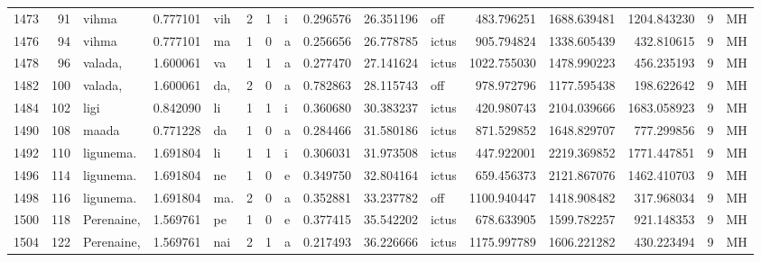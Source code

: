 \begin{tabular}{lrlrllllrrlrrrll}
1473 &          91 &            vihma &  0.777101 &     vih &        2 &      1 &       i &      0.296576 &     26.351196 &    off &   483.796251 &  1688.639481 &  1204.843230 &      9 &        MH \\
1476 &          94 &            vihma &  0.777101 &      ma &        1 &      0 &       a &      0.256656 &     26.778785 &  ictus &   905.794824 &  1338.605439 &   432.810615 &      9 &        MH \\
1478 &          96 &          valada, &  1.600061 &      va &        1 &      1 &       a &      0.277470 &     27.141624 &  ictus &  1022.755030 &  1478.990223 &   456.235193 &      9 &        MH \\
1482 &         100 &          valada, &  1.600061 &     da, &        2 &      0 &       a &      0.782863 &     28.115743 &    off &   978.972796 &  1177.595438 &   198.622642 &      9 &        MH \\
1484 &         102 &             ligi &  0.842090 &      li &        1 &      1 &       i &      0.360680 &     30.383237 &  ictus &   420.980743 &  2104.039666 &  1683.058923 &      9 &        MH \\
1490 &         108 &            maada &  0.771228 &      da &        1 &      0 &       a &      0.284466 &     31.580186 &  ictus &   871.529852 &  1648.829707 &   777.299856 &      9 &        MH \\
1492 &         110 &        ligunema. &  1.691804 &      li &        1 &      1 &       i &      0.306031 &     31.973508 &  ictus &   447.922001 &  2219.369852 &  1771.447851 &      9 &        MH \\
1496 &         114 &        ligunema. &  1.691804 &      ne &        1 &      0 &       e &      0.349750 &     32.804164 &  ictus &   659.456373 &  2121.867076 &  1462.410703 &      9 &        MH \\
1498 &         116 &        ligunema. &  1.691804 &     ma. &        2 &      0 &       a &      0.352881 &     33.237782 &    off &  1100.940447 &  1418.908482 &   317.968034 &      9 &        MH \\
1500 &         118 &       Perenaine, &  1.569761 &      pe &        1 &      0 &       e &      0.377415 &     35.542202 &  ictus &   678.633905 &  1599.782257 &   921.148353 &      9 &        MH \\
1504 &         122 &       Perenaine, &  1.569761 &     nai &        2 &      1 &       a &      0.217493 &     36.226666 &  ictus &  1175.997789 &  1606.221282 &   430.223494 &      9 &        MH \\

\end{tabular}
